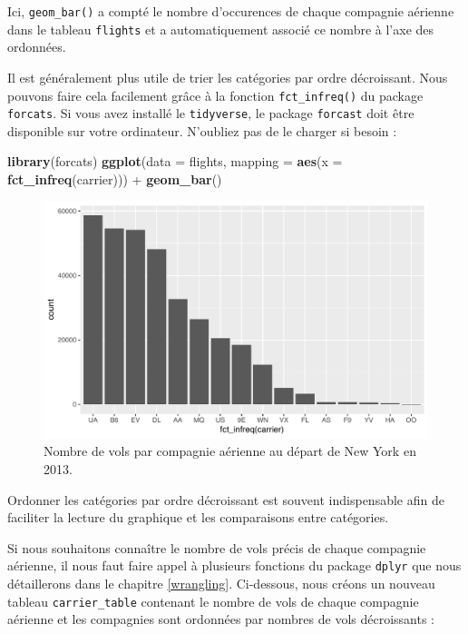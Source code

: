 \documentclass[a4paperpaper,]{article}
\newenvironment{Shaded}{\begin{snugshade}}{\end{snugshade}}
\newcommand{\DataTypeTok}[1]{\textcolor[rgb]{0.00,0.34,0.68}{#1}}
\newcommand{\KeywordTok}[1]{\textcolor[rgb]{0.12,0.11,0.11}{\textbf{#1}}}
\newcommand{\NormalTok}[1]{\textcolor[rgb]{0.12,0.11,0.11}{#1}}
\newcommand{\OperatorTok}[1]{\textcolor[rgb]{0.12,0.11,0.11}{#1}}
\newcommand{\StringTok}[1]{\textcolor[rgb]{0.75,0.01,0.01}{#1}}
\begin{document}
Ici, \texttt{geom\_bar()} a compté le nombre d'occurences de chaque compagnie aérienne dans le tableau \texttt{flights} et a automatiquement associé ce nombre à l'axe des ordonnées.

Il est généralement plus utile de trier les catégories par ordre décroissant. Nous pouvons faire cela facilement grâce à la fonction \texttt{fct\_infreq()} du package \texttt{forcats}. Si vous avez installé le \texttt{tidyverse}, le package \texttt{forcast} doit être disponible sur votre ordinateur. N'oubliez pas de le charger si besoin :

\begin{Shaded}
\begin{Highlighting}[]
\KeywordTok{library}\NormalTok{(forcats)}
\KeywordTok{ggplot}\NormalTok{(}\DataTypeTok{data =}\NormalTok{ flights, }\DataTypeTok{mapping =} \KeywordTok{aes}\NormalTok{(}\DataTypeTok{x =} \KeywordTok{fct_infreq}\NormalTok{(carrier))) }\OperatorTok{+}
\StringTok{  }\KeywordTok{geom_bar}\NormalTok{()}
\end{Highlighting}
\end{Shaded}

\begin{figure}[htpb]

{\centering \includegraphics[width=0.9\linewidth]{figure/bpcarriersorted-1} 

}

\caption{Nombre de vols par compagnie aérienne au départ de New York en 2013.}\label{fig:bpcarriersorted}
\end{figure}

Ordonner les catégories par ordre décroissant est souvent indispensable afin de faciliter la lecture du graphique et les comparaisons entre catégories.

Si nous souhaitons connaître le nombre de vols précis de chaque compagnie aérienne, il nous faut faire appel à plusieurs fonctions du package \texttt{dplyr} que nous détaillerons dans le chapitre \ref{wrangling}. Ci-dessous, nous créons un nouveau tableau \texttt{carrier\_table} contenant le nombre de vols de chaque compagnie aérienne et les compagnies sont ordonnées par nombres de vols décroissants :
\end{document}
